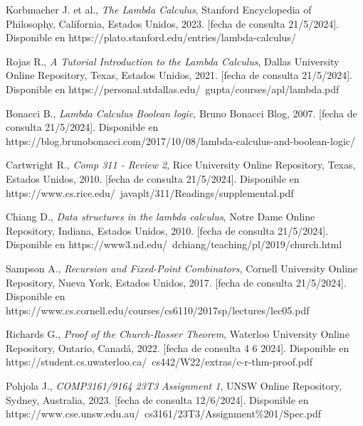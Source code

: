 \begin{thebibliography}{11}
     \bibitem{}
    \label{sec:108}
    \hypertarget{108}{}
    Korbmacher J. et al., \textit{The Lambda Calculus}, Stanford Encyclopedia of Philosophy, California, Estados Unidos, 2023.  [fecha de consulta 21/5/2024]. Disponible en https://plato.stanford.edu/entries/lambda-calculus/

     \bibitem{}
    \label{sec:109}
    \hypertarget{109}{}
    Rojas R., \textit{A Tutorial Introduction to the Lambda Calculus}, Dallas University Online Repository, Texas, Estados Unidos, 2021.  [fecha de consulta 21/5/2024]. Disponible en https://personal.utdallas.edu/~gupta/courses/apl/lambda.pdf

     \bibitem{}
    \label{sec:110}
    \hypertarget{110}{}
    Bonacci B., \textit{Lambda Calculus Boolean logic}, Bruno Bonacci Blog, 2007.  [fecha de consulta 21/5/2024]. Disponible en https://blog.brunobonacci.com/2017/10/08/lambda-calculus-and-boolean-logic/

     \bibitem{}
    \label{sec:111}
    \hypertarget{111}{}
    Cartwright R., \textit{Comp 311 - Review 2}, Rice University Online Repository, Texas, Estados Unidos, 2010.  [fecha de consulta 21/5/2024]. Disponible en https://www.cs.rice.edu/~javaplt/311/Readings/supplemental.pdf

     \bibitem{}
    \label{sec:112}
    \hypertarget{112}{}
    Chiang D., \textit{Data structures in the lambda calculus}, Notre Dame Online Repository, Indiana, Estados Unidos, 2010.  [fecha de consulta 21/5/2024]. Disponible en https://www3.nd.edu/~dchiang/teaching/pl/2019/church.html

     \bibitem{}
    \label{sec:113}
    \hypertarget{113}{}
    Sampson A., \textit{Recursion and Fixed-Point Combinators}, Cornell University Online Repository, Nueva York, Estados Unidos, 2017.  [fecha de consulta 21/5/2024]. Disponible en https://www.cs.cornell.edu/courses/cs6110/2017sp/lectures/lec05.pdf

     \bibitem{}
    \label{sec:114}
    \hypertarget{114}{}
    Richards G., \textit{Proof of the Church-Rosser Theorem}, Waterloo University Online Repository, Ontario, Canadá, 2022.  [fecha de consulta 4 6 2024]. Disponible en https://student.cs.uwaterloo.ca/~cs442/W22/extras/c-r-thm-proof.pdf

    \bibitem{}
    \label{sec:115}
    \hypertarget{115}{}
    Pohjola J., \textit{COMP3161/9164 23T3 Assignment 1}, UNSW Online Repository, Sydney, Australia, 2023.  [fecha de consulta 12/6/2024]. Disponible en https://www.cse.unsw.edu.au/~cs3161/23T3/Assignment\%201/Spec.pdf


\end{thebibliography}
